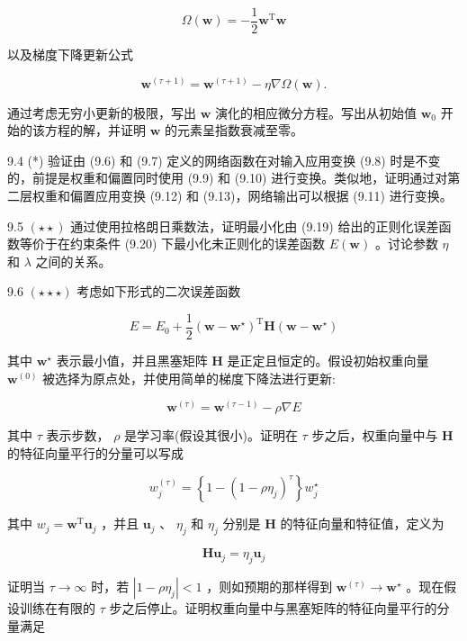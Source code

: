 \documentclass[10pt]{report}
\begin{document}
\[
\Omega \left( \mathbf{w}\right)  =  - \frac{1}{2}{\mathbf{w}}^{\mathrm{T}}\mathbf{w} \tag{9.54}
\]

以及梯度下降更新公式

\[
{\mathbf{w}}^{\left( \tau  + 1\right) } = {\mathbf{w}}^{\left( \tau  + 1\right) } - \eta \nabla \Omega \left( \mathbf{w}\right) . \tag{9.55}
\]

通过考虑无穷小更新的极限，写出 \(\mathbf{w}\) 演化的相应微分方程。写出从初始值 \({\mathbf{w}}_{0}\) 开始的该方程的解，并证明 \(\mathbf{w}\) 的元素呈指数衰减至零。

9.4 (*) 验证由 (9.6) 和 (9.7) 定义的网络函数在对输入应用变换 (9.8) 时是不变的，前提是权重和偏置同时使用 (9.9) 和 (9.10) 进行变换。类似地，证明通过对第二层权重和偏置应用变换 (9.12) 和 (9.13)，网络输出可以根据 (9.11) 进行变换。

9.5 \(\left( {\star  \star  }\right)\) 通过使用拉格朗日乘数法，证明最小化由 (9.19) 给出的正则化误差函数等价于在约束条件 (9.20) 下最小化未正则化的误差函数 \(E\left( \mathbf{w}\right)\) 。讨论参数 \(\eta\) 和 \(\lambda\) 之间的关系。

9.6 \(\left( {\star  \star   \star  }\right)\) 考虑如下形式的二次误差函数

\[
E = {E}_{0} + \frac{1}{2}{\left( \mathbf{w} - {\mathbf{w}}^{ \star  }\right) }^{\mathrm{T}}\mathbf{H}\left( {\mathbf{w} - {\mathbf{w}}^{ \star  }}\right)  \tag{9.56}
\]

其中 \({\mathbf{w}}^{ \star  }\) 表示最小值，并且黑塞矩阵 \(\mathbf{H}\) 是正定且恒定的。假设初始权重向量 \({\mathbf{w}}^{\left( 0\right) }\) 被选择为原点处，并使用简单的梯度下降法进行更新:

\[
{\mathbf{w}}^{\left( \tau \right) } = {\mathbf{w}}^{\left( \tau  - 1\right) } - \rho \nabla E \tag{9.57}
\]

其中 \(\tau\) 表示步数， \(\rho\) 是学习率(假设其很小)。证明在 \(\tau\) 步之后，权重向量中与 \(\mathbf{H}\) 的特征向量平行的分量可以写成

\[
{w}_{j}^{\left( \tau \right) } = \left\{  {1 - {\left( 1 - \rho {\eta }_{j}\right) }^{\tau }}\right\}  {w}_{j}^{ \star  } \tag{9.58}
\]

其中 \({w}_{j} = {\mathbf{w}}^{\mathrm{T}}{\mathbf{u}}_{j}\) ，并且 \({\mathbf{u}}_{j}\) 、 \({\eta }_{j}\) 和 \({\eta }_{j}\) 分别是 \(\mathbf{H}\) 的特征向量和特征值，定义为

\[
\mathbf{H}{\mathbf{u}}_{j} = {\eta }_{j}{\mathbf{u}}_{j} \tag{9.59}
\]

证明当 \(\tau  \rightarrow  \infty\) 时，若 \(\left| {1 - \rho {\eta }_{j}}\right|  < 1\) ，则如预期的那样得到 \({\mathbf{w}}^{\left( \tau \right) } \rightarrow  {\mathbf{w}}^{ \star  }\) 。现在假设训练在有限的 \(\tau\) 步之后停止。证明权重向量中与黑塞矩阵的特征向量平行的分量满足
\end{document}
